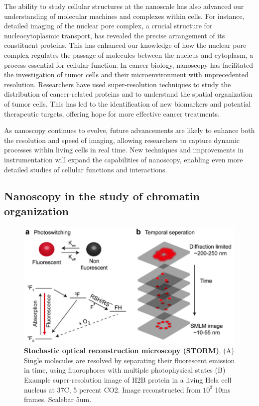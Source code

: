 The ability to study cellular structures at the nanoscale has also advanced our understanding of molecular machines and complexes within cells. For instance, detailed imaging of the nuclear pore complex, a crucial structure for nucleocytoplasmic transport, has revealed the precise arrangement of its constituent proteins. This has enhanced our knowledge of how the nuclear pore complex regulates the passage of molecules between the nucleus and cytoplasm, a process essential for cellular function. In cancer biology, nanoscopy has facilitated the investigation of tumor cells and their microenvironment with unprecedented resolution. Researchers have used super-resolution techniques to study the distribution of cancer-related proteins and to understand the spatial organization of tumor cells. This has led to the identification of new biomarkers and potential therapeutic targets, offering hope for more effective cancer treatments.

As nanoscopy continues to evolve, future advancements are likely to enhance both the resolution and speed of imaging, allowing researchers to capture dynamic processes within living cells in real time. New techniques and improvements in instrumentation will expand the capabilities of nanoscopy, enabling even more detailed studies of cellular functions and interactions.

\subsection{Nanoscopy in the study of chromatin organization}


\begin{figure}[t]
\includegraphics[width=12cm]{media/Intro.png}
\caption{\textbf{Stochastic optical reconstruction microscopy (STORM)}. (A) Single molecules are resolved by separating their fluorescent emission in time, using fluorophores with multiple photophysical states (B) Example super-resolution image of H2B protein in a living Hela cell nucleus at 37C, 5 percent CO2. Image reconstructed from $10^{3}$ 10ms frames. Scalebar 5um.}
\end{figure}

